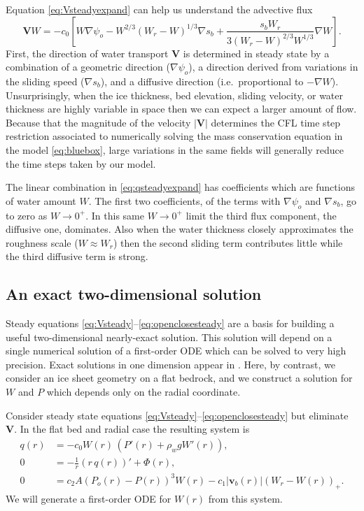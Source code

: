 \documentclass[11pt,final]{amsart}%
\newcommand\bv{\mathbf{v}}
\newcommand\bV{\mathbf{V}}
\newcommand{\grad}{\nabla}
\begin{document}
Equation \eqref{eq:Vsteadyexpand} can help us understand the advective flux
\begin{equation}
\bV W = - c_0 \left[W \grad \psi_o - W^{2/3} \left(W_r - W\right)^{1/3} \grad s_b + \frac{s_b W_r}{3 (W_r - W)^{2/3} W^{1/3}} \grad W\right].  \label{eq:qsteadyexpand}
\end{equation}
First, the direction of water transport $\bV$ is determined in steady state by a combination of a geometric direction ($\grad \psi_o$), a direction derived from variations in the sliding speed ($\grad s_b$), and a diffusive direction (i.e.~proportional to $-\grad W$).  Unsurprisingly, when the ice thickness, bed elevation, sliding velocity, or water thickness are highly variable in space then we can expect a larger amount of flow.  Because that the magnitude of the velocity $|\bV|$ determines the CFL time step restriction \citep{MortonMayers} associated to numerically solving the mass conservation equation in the model \eqref{eq:bluebox}, large variations in the same fields will generally reduce the time steps taken by our model.

The linear combination in \eqref{eq:qsteadyexpand} has coefficients which are functions of water amount $W$.  The first two coefficients, of the terms with $\grad \psi_o$ and $\grad s_b$, go to zero as $W\to 0^+$.  In this same $W\to 0^+$ limit the third flux component, the diffusive one, dominates.  Also when the water thickness closely approximates the roughness scale ($W\approx W_r$) then the second sliding term contributes little while the third diffusive term is strong.

\subsection*{An exact two-dimensional solution}  Steady equations \eqref{eq:Vsteady}--\eqref{eq:openclosesteady} are a basis for building a useful two-dimensional nearly-exact solution.  This solution will depend on a single numerical solution of a first-order ODE which can be solved to very high precision.  Exact solutions in one dimension appear in \cite{Schoofetal2012}.  Here, by contrast, we consider an ice sheet geometry on a flat bedrock, and we construct a solution for $W$ and $P$ which depends only on the radial coordinate.

Consider steady state equations \eqref{eq:Vsteady}--\eqref{eq:openclosesteady} but eliminate $\bV$.  In the flat bed and radial case the resulting system is
\begin{align}
q(r) &= - c_0 W(r)\, \left(P'(r) + \rho_w g W'(r)\right), \label{eq:rsflux} \\
0 &= - \frac{1}{r}\left(r\,q(r)\right)' + \Phi(r), \label{eq:rsconserve} \\
0 &= c_2 A (P_o(r) - P(r))^3 W(r) - c_1 |\bv_b(r)| (W_r - W(r))_+. \label{eq:rsopenclose}
\end{align}
We will generate a first-order ODE for $W(r)$ from this system.
\end{document}
